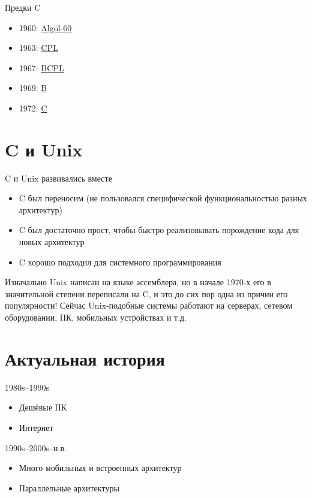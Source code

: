 \documentclass[xetex,aspectratio=169]{beamer}
\begin{document}
\begin{frame}{Предки C}
	\begin{itemize}
		\item 1960: \href{https://en.wikipedia.org/wiki/ALGOL_60\#Code_sample_comparisons}{Algol-60}
		\item 1963: \href{https://en.wikipedia.org/wiki/CPL_(programming_language)\#Example}{CPL}
		\item 1967: \href{https://en.wikipedia.org/wiki/BCPL\#Examples}{BCPL}
		\item 1969: \href{https://en.wikipedia.org/wiki/B_(programming_language)\#Examples}{B}
		\item 1972: \href{https://en.wikipedia.org/wiki/C_(programming_language)\#\%22Hello,_world\%22_example}{C}
	\end{itemize}
\end{frame}

\section{C и Unix}

\begin{frame}{C и Unix развивались вместе}
	\begin{itemize}
		\item C был переносим (не пользовался специфической функциональностью разных архитектур)
		\item C был достаточно прост, чтобы быстро реализовывать порождение кода для новых архитектур
		\item C хорошо подходил для системного программирования
	\end{itemize}

	\pause
    Изначально Unix написан на языке ассемблера, но в начале 1970-х его в значительной степени переписали на C, и это до сих пор одна из причин его популярности! Сейчас Unix-подобные системы работают на серверах, сетевом оборудовании, ПК, мобильных устройствах и т.д.
\end{frame}

\section{Актуальная история}

\begin{frame}{1980s--1990s}
	\begin{itemize}
	\item Дешёвые ПК
	\item Интернет
	\end{itemize}
\end{frame}

\begin{frame}{1990s--2000s--н.в.}
	\begin{itemize}
		\item Много мобильных и встроенных архитектур
		\item Параллельные архитектуры
	\end{itemize}
\end{frame}

\postamble
\end{document}
